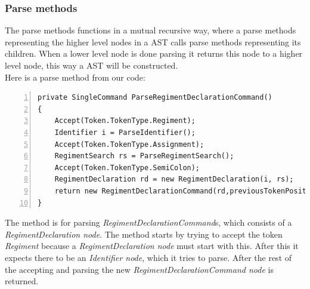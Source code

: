 		\subsubsection{Parse methods}
			\label{parsemethods}
			The parse methods functions in a mutual recursive way, where a parse methods representing the higher level nodes in a 
			AST calls parse methods representing its children. When a lower level node is done parsing it returns this node to a higher level node,
			this way a AST will be constructed. \\
			Here is a parse method from our code:
			\begin{lstlisting}[basicstyle=\small\sffamily,
					keywords={break,case,const,continue,default,else,enum,
					for,if,return,switch,while,do,long,void,int,float,double,
					char,struct,typedef,include,size\_t},
					keywordstyle={\color{blue}},
					comment={[l]{//}}, morecomment={[s]{/*}{*/}}, commentstyle=\itshape,
					columns={[l]flexible}, numbers=left, numberstyle=\tiny,
					frameround=fftt, frame=shadowbox, captionpos=b,
					caption={Parse method for RegimentDeclarationCommand},
					label=impl:regdeccmd]
private SingleCommand ParseRegimentDeclarationCommand()
{
    Accept(Token.TokenType.Regiment);
 	Identifier i = ParseIdentifier();
  	Accept(Token.TokenType.Assignment);
    RegimentSearch rs = ParseRegimentSearch();
    Accept(Token.TokenType.SemiColon);
	RegimentDeclaration rd = new RegimentDeclaration(i, rs);
	return new RegimentDeclarationCommand(rd,previousTokenPosition);
}
			\end{lstlisting}
			The method is for parsing {\it RegimentDeclarationCommand}s, which consists of a {\it RegimentDeclaration node}.
			The method starts by trying to accept the token {\it Regiment} because a {\it RegimentDeclaration node} must start with this. 
			After this it expects there to be an {\it Identifier node}, which it tries to parse. After the rest of the accepting and parsing the new 
			{\it RegimentDeclarationCommand node} is returned.
		
		